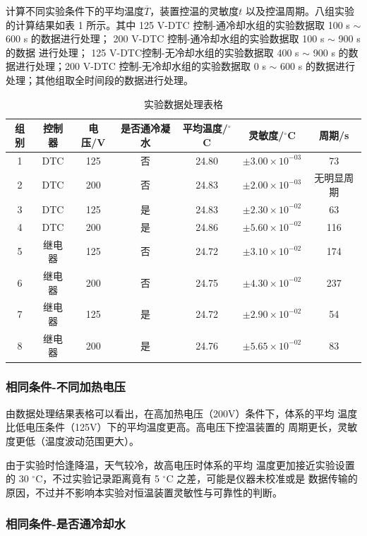\documentclass[12pt]{ctexart}
\numberwithin{equation}{section}
\begin{document}
计算不同实验条件下的平均温度$\overline{T}$，装置控温的灵敏度$t$
以及控温周期。八组实验的计算结果如表 1 所示。其中 125 V-DTC
控制-通冷却水组的实验数据取 100 s $\sim$ 600 s 的数据进行处理；
200 V-DTC 控制-通冷却水组的实验数据取 100 s $\sim$ 900 s 的数据
进行处理； 125 V-DTC控制-无冷却水组的实验数据取 400 s $\sim$
900 s 的数据进行处理；200 V-DTC 控制-无冷却水组的实验数据取 0 s
$\sim$ 600 s 的数据进行处理；其他组取全时间段的数据进行处理。

\begin{longtable}{ccccccc}
    \caption{实验数据处理表格} \\
    \hline
    组别 & 控制器 & 电压/V & 是否通冷凝水 & 平均温度/$^\circ$C
        & 灵敏度/$^\circ$C & 周期/s \\
    \hline
    1 & DTC & 125 & 否 & 24.80 & $\pm3.00\times 10^{-03}$& 73 \\
    2 & DTC & 200 & 否 & 24.83 & $\pm2.00\times 10^{-03}$ & 无明显周期 \\
    3 & DTC & 125 & 是 & 24.83 & $\pm2.30\times 10^{-02}$ & 63 \\
    4 & DTC & 200 & 是 & 24.86 & $\pm5.60\times 10^{-02}$ & 116 \\
    5 & 继电器 & 125 & 否 & 24.72 & $\pm3.10\times 10^{-02}$ & 174 \\
    6 & 继电器 & 200 & 否 & 24.75 & $\pm4.30\times 10^{-02}$ & 237 \\
    7 & 继电器 & 125 & 是 & 24.72 & $\pm2.90\times 10^{-02}$ & 54 \\
    8 & 继电器 & 200 & 是 & 24.76 & $\pm5.65\times 10^{-02}$ & 83 \\
    \hline
\end{longtable}

\subsubsection*{相同条件-不同加热电压}

由数据处理结果表格可以看出，在高加热电压（200V）条件下，体系的平均
温度比低电压条件（125V）下的平均温度更高。高电压下控温装置的
周期更长，灵敏度更低（温度波动范围更大）。

由于实验时恰逢降温，天气较冷，故高电压时体系的平均
温度更加接近实验设置的 30 $^\circ$C，不过实验记录距离竟有 5 $^\circ$C 之差，可能是仪器未校准或是
数据传输的原因，不过并不影响本实验对恒温装置灵敏性与可靠性的判断。

\subsubsection*{相同条件-是否通冷却水}
\end{document}
